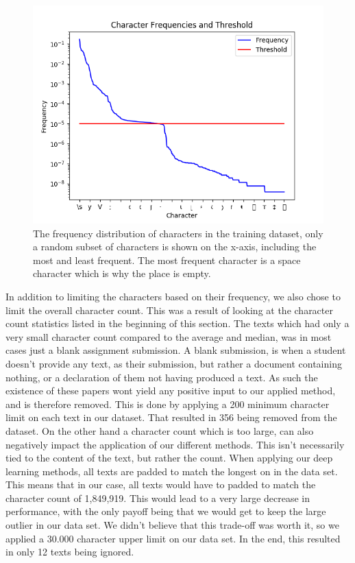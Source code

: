 \begin{figure}[htb]
    \centering
    \includegraphics[scale=.8]{./pictures/data/character_frequencies.png}
    \caption{The frequency distribution of characters in the training dataset,
        only a random subset of characters is shown on the x-axis, including the
        most and least frequent. The most frequent character is a space
        character which is why the place is empty.}
    \label{fig:character_frequencies}
\end{figure}

In addition to limiting the characters based on their frequency, we also chose
to limit the overall character count. This was a result of looking at the
character count statistics listed in the beginning of this section. The texts
which had only a very small character count compared to the average and median,
was in most cases just a blank assignment submission. A blank submission, is
when a student doesn't provide any text, as their submission, but rather a
document containing nothing, or a declaration of them not having produced a
text. As such the existence of these papers wont yield any positive input to our
applied method, and is therefore removed. This is done by applying a 200 minimum
character limit on each text in our dataset. That resulted in 356 being removed
from the dataset. On the other hand a character count which is too large, can
also negatively impact the application of our different methods. This isn't
necessarily tied to the content of the text, but rather the count. When applying
our deep learning methods, all texts are padded to match the longest on in the
data set. This means that in our case, all texts would have to padded to match
the character count of 1,849,919. This would lead to a very large decrease in
performance, with the only payoff being that we would get to keep the large
outlier in our data set. We didn't believe that this trade-off was worth it,
so we applied a 30.000 character upper limit on our data set. In the end, this
resulted in only 12 texts being ignored.

